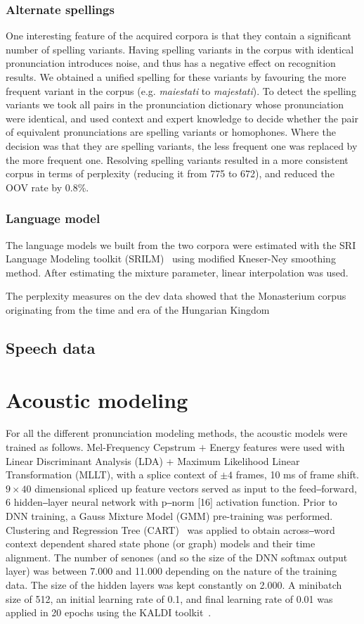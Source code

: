 \documentclass[runningheads,a4paper]{llncs}
\begin{document}
\subsubsection{Alternate spellings}
One interesting feature of the acquired corpora is that they contain a significant number of spelling variants.
Having spelling variants in the corpus with identical pronunciation introduces noise, and thus has a negative effect on recognition results.
We obtained a unified spelling for these variants by favouring the more frequent variant in the corpus (e.g. \textit{maiestati} to \textit{majestati}).
To detect the spelling variants we took all pairs in the pronunciation dictionary whose pronunciation were identical, and used context and expert knowledge to decide whether the pair of equivalent pronunciations are spelling variants or homophones.
Where the decision was that they are spelling variants, the less frequent one was replaced by the more frequent one.
Resolving spelling variants resulted in a more consistent corpus in terms of perplexity (reducing it from 775 to 672), and reduced the OOV rate by 0.8\%.
\subsubsection{Language model}
The language models we built from the two corpora were estimated with the SRI Language Modeling toolkit (SRILM)~\cite{srilm} using modified Kneser-Ney smoothing method.
After estimating the mixture parameter, linear interpolation was used.

The perplexity measures on the dev data showed that the Monasterium corpus originating from the time and era of the Hungarian Kingdom
\subsection{Speech data}
\section{Acoustic modeling}
For all the different pronunciation modeling methods, the acoustic models were trained as follows.
Mel-Frequency Cepstrum $+$ Energy features were used with Linear Discriminant Analysis (LDA) + Maximum Likelihood Linear Transformation (MLLT), with a splice context of $\pm4$ frames, 10 ms of frame shift.
$9\times40$ dimensional spliced up feature vectors served as input to the feed‒forward, 6 hidden‒layer neural network with p‒norm [16] activation function.
Prior to DNN training, a Gauss Mixture Model (GMM) pre-training was performed.
Clustering and Regression Tree (CART)~\cite{kaldi} was applied to obtain across‒word context dependent shared state phone (or graph) models and their time alignment.
The number of senones (and so the size of the DNN softmax output layer) was between 7.000 and 11.000 depending on the nature of the training data.
The size of the hidden layers was kept constantly on 2.000.
A minibatch size of 512, an initial learning rate of 0.1, and final learning rate of 0.01 was applied in 20 epochs using the KALDI toolkit~\cite{kaldi}.
\end{document}
